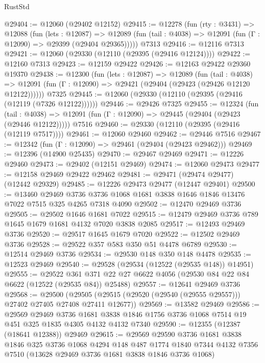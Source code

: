 \begin{lexlean}{RustStd}
\begin{coremodule}
@29404 := @12060 (@29402 @12152)
@29415 := @12278
    (fun (rty : @3431) =>
    @12088
      (fun (lets : @12087) =>
      @12089 (fun (tail : @4038) => @12091 (fun (Γ : @12090) => @29399 (@29404 @29365)))))
    @7313
@29416 := @12116 @7313
@29421 := @12060 (@29330 (@12110 (@29395 (@29416 @12124))))
@29422 := @12160 @7313
@29423 := @12159 @29422
@29426 := @12163 @29422 @29360 @19370
@29438 := @12300
    (fun (lets : @12087) =>
    @12089
      (fun (tail : @4038) =>
      @12091 (fun (Γ : @12090) => @29421 (@29404 (@29423 (@29426 @12120 @12122))))))
    @7325
@29445 := @12060 (@29330 (@12110 (@29395 (@29416 (@12119 (@7326 @12122))))))
@29446 := @29426 @7325
@29455 := @12324
    (fun (tail : @4038) => @12091 (fun (Γ : @12090) => @29445 (@29404 (@29423 (@29446 @12122)))))
    @7516
@29460 := @29330 (@12110 (@29395 (@29416 (@12119 @7517))))
@29461 := @12060 @29460
@29462 := @29446 @7516
@29467 := @12342 (fun (Γ : @12090) => @29461 (@29404 (@29423 @29462)))
@29469 := @12396 (@14900 @25435)
@29470 := @29467 @29469
@29471 := @12226 @29460
@29473 := @29402 (@12151 @29469)
@29474 := @12060 @29473
@29477 := @12158 @29469 @29422 @29462
@29481 := @29471 (@29474 @29477) (@12442 @29329)
@29485 := @12226 @29473 @29477 (@12447 @29401)
@29500 := @13460
    @29469
    @3736
    @3736
    @1068
    @1681
    @3838
    @1646
    @1846
    @13476
    @7022
    @7515
    @325
    @4265
    @7318
    @4090
@29502 := @12470 @29469 @3736
@29505 := @29502 @1646 @1681 @7022
@29515 := @12479 @29469 @3736 @789 @1645 @1679 @1681 @4132 @7020 @3838 @2085
@29517 := @12493 @29469 @3736
@29520 := @29517 @1645 @1679 @7020
@29522 := @12502 @29469 @3736
@29528 := @29522 @357 @583 @350 @51 @4478 @6789
@29530 := @12514 @29469 @3736
@29534 := @29530 @148 @350 @148 @4478
@29535 := @12523 @29469
@29540 := @29528 (@29534 (@12522 (@29535 @148)) @14951)
@29555 := @29522
    @361
    @371
    @22
    @27
    @6622
    @4056
    (@29530 @84 @22 @84 @6622 (@12522 (@29535 @84)) @25488)
@29557 := @12641 @29469 @3736
@29568 := @29500
    (@29505 (@29515 (@29520 (@29540 (@29555 @29557))) @27402 @27405 @27408 @27411 @12677))
@29569 := @13582 @29469
@29586 := @29569
    @29469
    @3736
    @1681
    @3838
    @1846
    @1756
    @3736
    @1068
    @7514
    @19
    @451
    @325
    @1835
    @4305
    @4132
    @4132
    @7340
@29590 := @12355 (@12387 (@18641 @12388)) @29469
@29615 := @29569
    @29590
    @3736
    @1681
    @3838
    @1846
    @325
    @3736
    @1068
    @4294
    @148
    @487
    @1774
    @1840
    @7344
    @4132
    @7356
    @7510
    (@13628 @29469 @3736 @1681 @3838 @1846 @3736 @1068)

\end{coremodule}
\end{lexlean}
